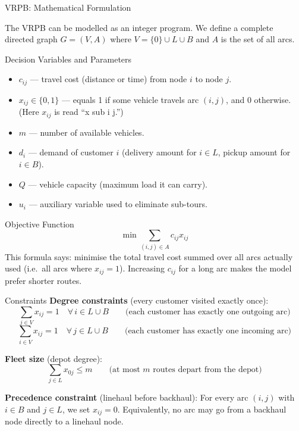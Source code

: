 \documentclass[aspectratio=169,10pt]{beamer}
\begin{document}
\begin{frame}[allowframebreaks]{VRPB: Mathematical Formulation}

The VRPB can be modelled as an integer program.  We define a complete directed
graph $G = (V, A)$ where $V = \{0\} \cup L \cup B$ and $A$ is the set of
all arcs.

\begin{block}{Decision Variables and Parameters}
  \begin{itemize}
    \item $c_{ij}$ --- travel cost (distance or time) from node $i$ to node $j$.
    \item $x_{ij} \in \{0,1\}$ --- equals 1 if some vehicle travels arc
          $(i,j)$, and 0 otherwise.  (Here $x_{ij}$ is read ``x sub i j.'')
    \item $m$ --- number of available vehicles.
    \item $d_i$ --- demand of customer $i$ (delivery amount for $i \in L$,
          pickup amount for $i \in B$).
    \item $Q$ --- vehicle capacity (maximum load it can carry).
    \item $u_i$ --- auxiliary variable used to eliminate sub-tours.
  \end{itemize}
\end{block}

\begin{block}{Objective Function}
  \[
    \min \sum_{(i,j) \in A} c_{ij} x_{ij}
  \]
  This formula says: minimise the total travel cost summed over all arcs
  actually used (i.e.\ all arcs where $x_{ij}=1$).  Increasing $c_{ij}$
  for a long arc makes the model prefer shorter routes.
\end{block}

\framebreak

\begin{block}{Constraints}
  \textbf{Degree constraints} (every customer visited exactly once):
  \[
    \sum_{j \in V} x_{ij} = 1 \quad \forall\, i \in L \cup B
    \qquad \text{(each customer has exactly one outgoing arc)}
  \]
  \[
    \sum_{i \in V} x_{ij} = 1 \quad \forall\, j \in L \cup B
    \qquad \text{(each customer has exactly one incoming arc)}
  \]

  \textbf{Fleet size} (depot degree):
  \[
    \sum_{j \in L} x_{0j} \leq m
    \qquad \text{(at most $m$ routes depart from the depot)}
  \]

  \textbf{Precedence constraint} (linehaul before backhaul):
  For every arc $(i,j)$ with $i \in B$ and $j \in L$, we set $x_{ij}=0$.
  Equivalently, no arc may go from a backhaul node directly to a linehaul node.


\end{block}
\end{frame}
\end{document}
